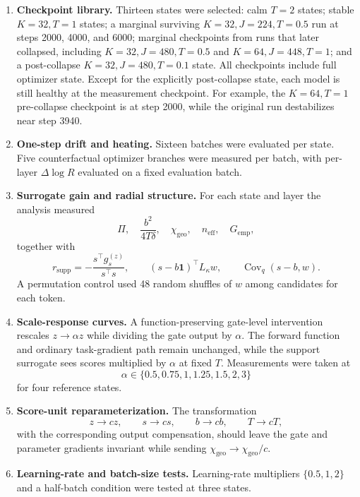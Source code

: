\documentclass[11pt,a4paper]{article}
\newcommand{\neff}{n_{\mathrm{eff}}}
\newcommand{\chigeo}{\chi_{\mathrm{geo}}}
\newcommand{\Pisurr}{\Pi}
\begin{document}
\begin{enumerate}[leftmargin=1.6em]
\item \textbf{Checkpoint library.} Thirteen states were selected: calm \(T=2\) states; stable \(K=32,T=1\) states; a marginal surviving \(K=32,J=224,T=0.5\) run at steps 2000, 4000, and 6000; marginal checkpoints from runs that later collapsed, including \(K=32,J=480,T=0.5\) and \(K=64,J=448,T=1\); and a post-collapse \(K=32,J=480,T=0.1\) state. All checkpoints include full optimizer state. Except for the explicitly post-collapse state, each model is still healthy at the measurement checkpoint. For example, the \(K=64,T=1\) pre-collapse checkpoint is at step 2000, while the original run destabilizes near step 3940.

\item \textbf{One-step drift and heating.} Sixteen batches were evaluated per state. Five counterfactual optimizer branches were measured per batch, with per-layer \(\Delta\log R\) evaluated on a fixed evaluation batch.

\item \textbf{Surrogate gain and radial structure.} For each state and layer the analysis measured
\[
\Pisurr,\quad \frac{b^2}{4T\delta},\quad \chigeo,\quad \neff,\quad G_{\mathrm{emp}},
\]
together with
\[
r_{\mathrm{supp}}=-\frac{s^\top g_s^{(z)}}{s^\top s},\qquad
(s-b\mathbf1)^\top L_\kappa w,\qquad
\operatorname{Cov}_q(s-b,w).
\]
A permutation control used 48 random shuffles of \(w\) among candidates for each token.

\item \textbf{Scale-response curves.} A function-preserving gate-level intervention rescales \(z\to\alpha z\) while dividing the gate output by \(\alpha\). The forward function and ordinary task-gradient path remain unchanged, while the support surrogate sees scores multiplied by \(\alpha\) at fixed \(T\). Measurements were taken at
\[
\alpha\in\{0.5,0.75,1,1.25,1.5,2,3\}
\]
for four reference states.

\item \textbf{Score-unit reparameterization.} The transformation
\[
z\to cz,\qquad s\to cs,\qquad b\to cb,\qquad T\to cT,
\]
with the corresponding output compensation, should leave the gate and parameter gradients invariant while sending \(\chigeo\to\chigeo/c\).

\item \textbf{Learning-rate and batch-size tests.} Learning-rate multipliers \(\{0.5,1,2\}\) and a half-batch condition were tested at three states.


\end{enumerate}
\end{document}
